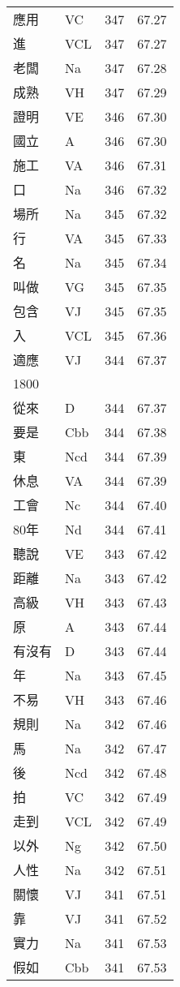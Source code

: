 \documentclass[twocolumn]{book}
\begin{document}
\begin{supertabular}{llrr}
應用 & VC & 347 &  67.27\\
進 & VCL & 347 &  67.27\\
老闆 & Na & 347 &  67.28\\
成熟 & VH & 347 &  67.29\\
證明 & VE & 346 &  67.30\\
國立 & A & 346 &  67.30\\
施工 & VA & 346 &  67.31\\
口 & Na & 346 &  67.32\\
場所 & Na & 345 &  67.32\\
行 & VA & 345 &  67.33\\
名 & Na & 345 &  67.34\\
叫做 & VG & 345 &  67.35\\
包含 & VJ & 345 &  67.35\\
入 & VCL & 345 &  67.36\\
適應 & VJ & 344 &  67.37\\
1800\\
從來 & D & 344 &  67.37\\
要是 & Cbb & 344 &  67.38\\
東 & Ncd & 344 &  67.39\\
休息 & VA & 344 &  67.39\\
工會 & Nc & 344 &  67.40\\
80年 & Nd & 344 &  67.41\\
聽說 & VE & 343 &  67.42\\
距離 & Na & 343 &  67.42\\
高級 & VH & 343 &  67.43\\
原 & A & 343 &  67.44\\
有沒有 & D & 343 &  67.44\\
年 & Na & 343 &  67.45\\
不易 & VH & 343 &  67.46\\
規則 & Na & 342 &  67.46\\
馬 & Na & 342 &  67.47\\
後 & Ncd & 342 &  67.48\\
拍 & VC & 342 &  67.49\\
走到 & VCL & 342 &  67.49\\
以外 & Ng & 342 &  67.50\\
人性 & Na & 342 &  67.51\\
關懷 & VJ & 341 &  67.51\\
靠 & VJ & 341 &  67.52\\
實力 & Na & 341 &  67.53\\
假如 & Cbb & 341 &  67.53\\

\end{supertabular}
\end{document}
